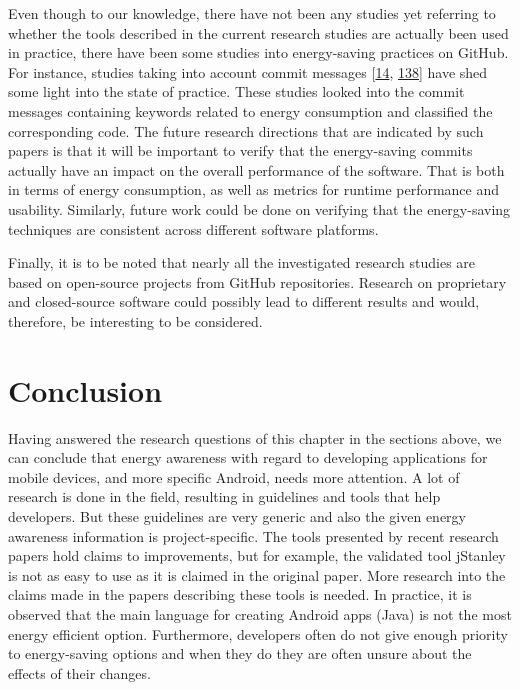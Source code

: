 \documentclass[]{book}
\begin{document}
Even though to our knowledge, there have not been any studies yet
referring to whether the tools described in the current research studies
are actually been used in practice, there have been some studies into
energy-saving practices on GitHub. For instance, studies taking into
account commit messages {[}\protect\hyperlink{ref-BLXWT2016}{14},
\protect\hyperlink{ref-MPEC2015}{138}{]} have shed some light into the
state of practice. These studies looked into the commit messages
containing keywords related to energy consumption and classified the
corresponding code. The future research directions that are indicated by
such papers is that it will be important to verify that the
energy-saving commits actually have an impact on the overall performance
of the software. That is both in terms of energy consumption, as well as
metrics for runtime performance and usability. Similarly, future work
could be done on verifying that the energy-saving techniques are
consistent across different software platforms.

Finally, it is to be noted that nearly all the investigated research
studies are based on open-source projects from GitHub repositories.
Research on proprietary and closed-source software could possibly lead
to different results and would, therefore, be interesting to be
considered.

\section{Conclusion}\label{conclusion-2}

Having answered the research questions of this chapter in the sections
above, we can conclude that energy awareness with regard to developing
applications for mobile devices, and more specific Android, needs more
attention. A lot of research is done in the field, resulting in
guidelines and tools that help developers. But these guidelines are very
generic and also the given energy awareness information is
project-specific. The tools presented by recent research papers hold
claims to improvements, but for example, the validated tool jStanley is
not as easy to use as it is claimed in the original paper. More research
into the claims made in the papers describing these tools is needed. In
practice, it is observed that the main language for creating Android
apps (Java) is not the most energy efficient option. Furthermore,
developers often do not give enough priority to energy-saving options
and when they do they are often unsure about the effects of their
changes.
\end{document}

